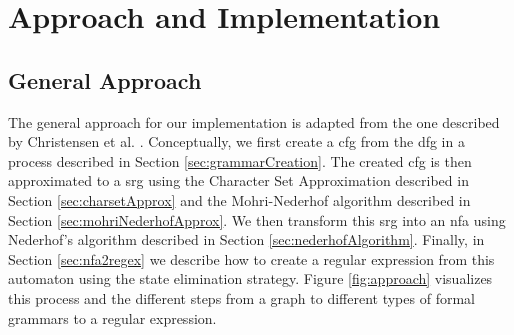 \chapter{Approach and Implementation}
\label{chapter:Approach}


\section{General Approach}

The general approach for our implementation is adapted from the one described by Christensen et al. \cite{brics}. Conceptually, we first create a \acf{cfg} from the \ac{dfg} in a process described in Section \ref{sec:grammarCreation}.
The created \ac{cfg} is then approximated to a \acf{srg} using the Character Set Approximation described in Section \ref{sec:charsetApprox} and the Mohri-Nederhof algorithm described in Section \ref{sec:mohriNederhofApprox}. We then transform this \ac{srg} into an \acf{nfa} using Nederhof's algorithm described in Section \ref{sec:nederhofAlgorithm}. Finally, in Section \ref{sec:nfa2regex} we describe how to create a regular expression from this automaton using the state elimination strategy. Figure \ref{fig:approach} visualizes this process and the different steps from a graph to different types of formal grammars to a regular expression.


